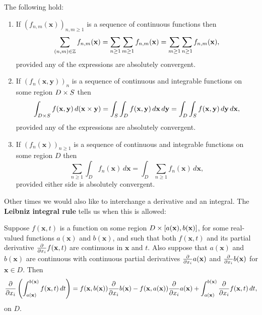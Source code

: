     \begin{theorem*}
      The following hold:
      \begin{enumerate}[label=(\roman*)]
        \item If $(f_{n,m}(\mathbf{x}))_{n,m \ge 1}$ is a sequence of continuous functions then
        \[
          \sum_{(n,m) \in \mathbb{Z}}f_{n,m}(\mathbf{x}) = \sum_{n \ge 1}\sum_{m \ge 1}f_{n,m}(\mathbf{x}) = \sum_{m \ge 1}\sum_{n \ge 1}f_{n,m}(\mathbf{x}),
        \]
        provided any of the expressions are absolutely convergent.
        \item If $(f_{n}(\mathbf{x},\mathbf{y}))_{n}$ is a sequence of continuous and integrable functions on some region $D \times S$ then
        \[
          \int_{D \times S}f(\mathbf{x},\mathbf{y})\,d(\mathbf{x} \times \mathbf{y}) = \int_{S}\int_{D}f(\mathbf{x},\mathbf{y})\,d\mathbf{x}\,d\mathbf{y} = \int_{D}\int_{S}f(\mathbf{x},\mathbf{y})\,d\mathbf{y}\,d\mathbf{x},
        \]
        provided any of the expressions are absolutely convergent.
        \item If $(f_{n}(\mathbf{x}))_{n \ge 1}$ is a sequence of continuous and integrable functions on some region $D$ then
        \[
         \sum_{n \ge 1}\int_{D}f_{n}(\mathbf{x})\,d\mathbf{x} = \int_{D}\sum_{n \ge 1}f_{n}(\mathbf{x})\,d\mathbf{x},
        \]
        provided either side is absolutely convergent.
      \end{enumerate}
    \end{theorem*}

    Other times we would also like to interchange a derivative and an integral. The \textbf{Leibniz integral rule} tells us when this is allowed:

    \begin{theorem*}
      Suppose $f(\mathbf{x},t)$ is a function on some region $D \times [a(\mathbf{x}),b(\mathbf{x})]$, for some real-valued functions $a(\mathbf{x})$ and $b(\mathbf{x})$, and such that both $f(\mathbf{x},t)$ and its partial derivative $\frac{\partial}{\partial x_{i}}f(\mathbf{x},t)$ are continuous in $\mathbf{x}$ and $t$. Also suppose that $a(\mathbf{x})$ and $b(\mathbf{x})$ are continuous with continuous partial derivatives $\frac{\partial}{\partial x_{i}}a(\mathbf{x})$ and $\frac{\partial}{\partial x_{i}}b(\mathbf{x})$ for $\mathbf{x} \in D$. Then
      \[
        \frac{\partial}{\partial x_{i}}\left(\int_{a(\mathbf{x})}^{b(\mathbf{x})}f(\mathbf{x},t)\,dt\right) = f(\mathbf{x},b(\mathbf{x}))\frac{\partial}{\partial x_{i}}b(\mathbf{x})-f(\mathbf{x},a(\mathbf{x}))\frac{\partial}{\partial x_{i}}a(\mathbf{x})+\int_{a(\mathbf{x})}^{b(\mathbf{x})}\frac{\partial}{\partial x_{i}}f(\mathbf{x},t)\,dt,
      \]
      on $D$.
    \end{theorem*}
    

